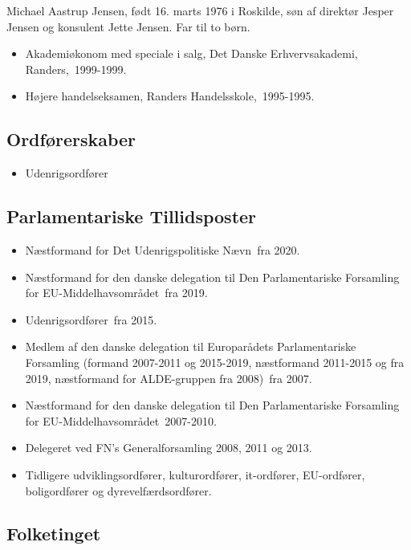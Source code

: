 \documentclass[11pt, a4paper]{awesome-cv}
\begin{document}
\makecvheader[R]
\makelettertitle
\begin{cvletter}
Michael Aastrup Jensen, født 16. marts 1976 i Roskilde, søn af direktør Jesper Jensen og konsulent Jette Jensen. Far til to børn.

\begin{itemize}
\item Akademiøkonom med speciale i salg, Det Danske Erhvervsakademi, Randers, 1999-1999.
\item Højere handelseksamen, Randers Handelsskole, 1995-1995.
\end{itemize}
\subsection*{Ordførerskaber}
\begin{itemize}
\item Udenrigsordfører
\end{itemize}
\subsection*{Parlamentariske Tillidsposter}
\begin{itemize}
\item Næstformand for Det Udenrigspolitiske Nævn fra 2020.
\item Næstformand for den danske delegation til Den Parlamentariske Forsamling for EU-Middelhavsområdet fra 2019.
\item Udenrigsordfører fra 2015.
\item Medlem af den danske delegation til Europarådets Parlamentariske Forsamling (formand 2007-2011 og 2015-2019, næstformand 2011-2015 og fra 2019, næstformand for ALDE-gruppen fra 2008) fra 2007.
\item Næstformand for den danske delegation til Den Parlamentariske Forsamling for EU-Middelhavsområdet 2007-2010.
\item Delegeret ved FN's Generalforsamling 2008, 2011 og 2013.
\item Tidligere udviklingsordfører, kulturordfører, it-ordfører, EU-ordfører, boligordfører og dyrevelfærdsordfører.
\end{itemize}
\subsection*{Folketinget}

\end{cvletter}
\end{document}
